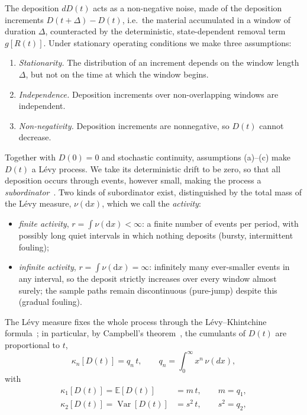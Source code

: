 \documentclass[preprint,12pt]{elsarticle}
\newcommand{\dd}{\mathrm{d}}
\begin{document}
The deposition $dD(t)$ acts as a non-negative noise, made of the deposition
increments $D(t+\Delta)-D(t)$, i.e.\ the material accumulated in a window of
duration $\Delta$, counteracted by the deterministic, state-dependent removal
term $g[R(t)]$. Under stationary operating conditions we make three
assumptions:
\begin{enumerate}
  \item[(a)] \textit{Stationarity.} The distribution of an increment depends
    on the window length $\Delta$, but not on the time at which the window
    begins.
  \item[(b)] \textit{Independence.} Deposition increments over
    non-overlapping windows are independent.
  \item[(c)] \textit{Non-negativity.} Deposition increments are nonnegative,
    so $D(t)$ cannot decrease.
\end{enumerate}
Together with $D(0)=0$ and stochastic continuity, assumptions (a)--(c) make
$D(t)$ a L\'evy process. We take its
deterministic drift to be zero, so that all deposition occurs through events,
however small, making the process a \emph{subordinator}~\cite{Sato1999,Applebaum2009}.
Two kinds of subordinator exist, distinguished by the total mass of the
L\'evy measure, $\nu(\dd x)$, which we call the \emph{activity}:
\begin{itemize}
  \item \emph{finite activity}, $r=\int\nu(\dd x)<\infty$: a finite number of events per period, with possibly long quiet intervals in which nothing deposits (bursty, intermittent fouling);
  \item \emph{infinite activity}, $r=\int\nu(\dd x)=\infty$: infinitely many ever-smaller events in any interval, so the deposit strictly increases over every window almost surely; the sample paths remain discontinuous (pure-jump) despite this (gradual fouling).
\end{itemize}
The L\'evy measure fixes the whole process through the L\'evy--Khintchine
formula~\cite{Sato1999,Applebaum2009}; in particular, by Campbell's
theorem~\cite{Campbell1909}, the cumulants of $D(t)$ are proportional to $t$,
\begin{equation}
  \kappa_n[D(t)]=q_n\,t,\qquad q_n=\int_0^\infty x^n\,\nu(dx),
  \label{eq:cumulant_rates}
\end{equation}
with
\begin{align}
  \kappa_1[D(t)]=\mathbb E[D(t)]&=m\,t, \qquad m=q_1, \label{eq:deposition_mean}\\
  \kappa_2[D(t)]=\operatorname{Var}[D(t)]&=s^2\,t, \qquad s^2=q_2, \label{eq:deposition_variance_rate}
\end{align}
\end{document}
